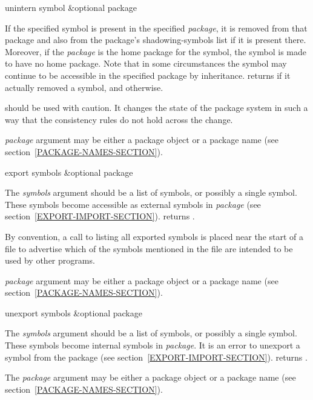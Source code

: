 \begin{defun}[Function]
unintern symbol &optional package

If the specified symbol is present in the specified \emph{package}, it is
removed from that package and also from the package's shadowing-symbols
list if it is present there.  Moreover, if the \emph{package} is the home
package for the symbol, the symbol is made to have no home package.
Note that in some circumstances the symbol may continue to be accessible
in the specified package by inheritance.
 returns {\true} if it actually removed a symbol,
and {\false} otherwise.

 should be used with caution.  It changes the state of the
package system in such a way that the consistency rules do not hold
across the change.

\emph{package} argument may be either a package object
or a package name (see section~\ref{PACKAGE-NAMES-SECTION}).
\end{defun}

\begin{defun}[Function]
export symbols &optional package

The \emph{symbols} argument should be a list of symbols, or possibly a single
symbol.  These symbols become accessible as external symbols in
\emph{package} (see section~\ref{EXPORT-IMPORT-SECTION}).
 returns {\true}.

By convention, a call to  listing all exported symbols is
placed near the start of a file to advertise which of the symbols
mentioned in the file are intended to be used by other programs.

\emph{package} argument may be either a package object
or a package name (see section~\ref{PACKAGE-NAMES-SECTION}).
\end{defun}

\begin{defun}[Function]
unexport symbols &optional package

The \emph{symbols} argument should be a list of symbols, or possibly a single symbol.
These symbols become internal symbols in \emph{package}.
It is an error to unexport a symbol from the  package
(see section~\ref{EXPORT-IMPORT-SECTION}).
 returns {\true}.

The \emph{package} argument may be either a package object
or a package name (see section~\ref{PACKAGE-NAMES-SECTION}).
\end{defun}

